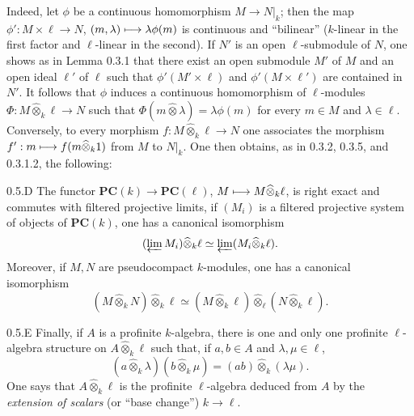 Indeed, let $\phi$ be a continuous homomorphism $M\to N|_k$; then the map $\phi':M\times\ell\to N$, $(m,\lambda)\longmapsto\lambda\phi(m)$ is continuous and ``bilinear'' (\ie $k$-linear in the first factor and $\ell$-linear in the second). If $N'$ is an open $\ell$-submodule of $N$, one shows as in Lemma 0.3.1 that there exist an open submodule $M'$ of $M$ and an open ideal $\ell'$ of $\ell$ such that $\phi'(M'\times\ell)$ and $\phi'(M\times\ell')$ are contained in $N'$. It follows that $\phi$ induces a continuous homomorphism of $\ell$-modules $\Phi:M\widehat\otimes_k\ell\to N$ such that $\Phi(m\widehat\otimes\lambda)=\lambda\phi(m)$ for every $m\in M$ and $\lambda\in\ell$.
Conversely, to every morphism $f:M\widehat\otimes_k\ell\to N$ one associates the morphism $f':m\longmapsto f(m\widehat\otimes_k1)$ from $M$ to $N|_k$.
One then obtains, as in 0.3.2, 0.3.5, and 0.3.1.2, the following:
\begin{corollary}{0.5.D}\label{VIIB.0.5.D}
The functor $\mathbf{PC}(k)\to\mathbf{PC}(\ell)$, $M\longmapsto M\widehat\otimes_k\ell$, is right exact and commutes with filtered projective limits, \ie if $(M_i)$ is a filtered projective system of objects of $\mathbf{PC}(k)$, one has a canonical isomorphism
\[
(\varprojlim M_i)\widehat\otimes_k\ell\simeq\varprojlim(M_i\widehat\otimes_k\ell).
\]
Moreover, if $M,N$ are pseudocompact $k$-modules, one has a canonical isomorphism
\[
(M\widehat\otimes_k N)\widehat\otimes_k\ell\simeq(M\widehat\otimes_k\ell)\widehat\otimes_\ell(N\widehat\otimes_k\ell).
\]
\end{corollary}
\begin{definition}{0.5.E}\label{VIIB.0.5.E}
Finally, if $A$ is a profinite $k$-algebra, there is one and only one profinite $\ell$-algebra structure on $A\widehat\otimes_k\ell$ such that, if $a,b\in A$ and $\lambda,\mu\in\ell$,
\[
(a\widehat\otimes_k\lambda)(b\widehat\otimes_k\mu)=(ab)\widehat\otimes_k(\lambda\mu).
\]
One says that $A\widehat\otimes_k\ell$ is the profinite $\ell$-algebra deduced from $A$ by the \emph{extension of scalars} (or ``base change'') $k\to\ell$.
\end{definition}

